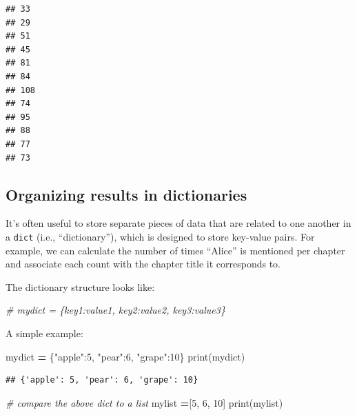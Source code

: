 \documentclass[
]{book}
\newenvironment{Shaded}{\begin{snugshade}}{\end{snugshade}}
\newcommand{\BuiltInTok}[1]{#1}
\newcommand{\CommentTok}[1]{\textcolor[rgb]{0.56,0.35,0.01}{\textit{#1}}}
\newcommand{\DecValTok}[1]{\textcolor[rgb]{0.00,0.00,0.81}{#1}}
\newcommand{\NormalTok}[1]{#1}
\newcommand{\OperatorTok}[1]{\textcolor[rgb]{0.81,0.36,0.00}{\textbf{#1}}}
\newcommand{\StringTok}[1]{\textcolor[rgb]{0.31,0.60,0.02}{#1}}
\begin{document}
\begin{verbatim}
## 33
## 29
## 51
## 45
## 81
## 84
## 108
## 74
## 95
## 88
## 77
## 73
\end{verbatim}

\hypertarget{organizing-results-in-dictionaries}{%
\subsection{Organizing results in dictionaries}\label{organizing-results-in-dictionaries}}

It's often useful to store separate pieces of data that are related to one another in a \texttt{dict} (i.e., ``dictionary''), which is designed to store key-value pairs. For example, we can calculate the number of times ``Alice'' is mentioned per chapter and associate each count with the chapter title it corresponds to.

The dictionary structure looks like:

\begin{Shaded}
\begin{Highlighting}[]
\CommentTok{\# mydict = \{key1:value1, key2:value2, key3:value3\}}
\end{Highlighting}
\end{Shaded}

A simple example:

\begin{Shaded}
\begin{Highlighting}[]
\NormalTok{mydict }\OperatorTok{=}\NormalTok{ \{}\StringTok{"apple"}\NormalTok{:}\DecValTok{5}\NormalTok{, }\StringTok{"pear"}\NormalTok{:}\DecValTok{6}\NormalTok{, }\StringTok{"grape"}\NormalTok{:}\DecValTok{10}\NormalTok{\}}
\BuiltInTok{print}\NormalTok{(mydict)}
\end{Highlighting}
\end{Shaded}

\begin{verbatim}
## {'apple': 5, 'pear': 6, 'grape': 10}
\end{verbatim}

\begin{Shaded}
\begin{Highlighting}[]
\CommentTok{\# compare the above dict to a list}
\NormalTok{mylist }\OperatorTok{=}\NormalTok{[}\DecValTok{5}\NormalTok{, }\DecValTok{6}\NormalTok{, }\DecValTok{10}\NormalTok{]}
\BuiltInTok{print}\NormalTok{(mylist)}
\end{Highlighting}
\end{Shaded}
\end{document}
